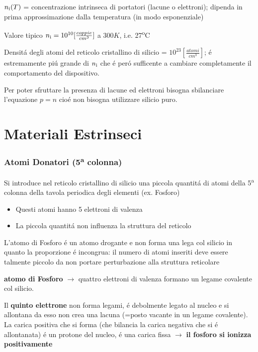 \documentclass{article}
\begin{document}
$n\textsubscript{i}(T)$ = concentrazione intrinseca di portatori (lacune o elettroni); dipenda in prima approssimazione dalla temperatura (in modo esponenziale)

Valore tipico $n\textsubscript{i}=10^{10} [\frac{coppie}{cm^3}]$ a 300$K$, i.e. 27\textsuperscript{o}C

Densit\'a degli atomi del reticolo cristallino di silicio = $10^{23} [\frac{atomi}{cm^3}]$; \'e estremamente pi\'u grande di $n\textsubscript{i}$ che \'e per\'o sufficente a cambiare completamente il comportamento del dispositivo.

Per poter sfruttare la presenza di lacune ed elettroni bisogna sbilanciare l'equazione $p=n$ cio\'e non bisogna utilizzare silicio puro.

\section{Materiali Estrinseci}
\subsubsection{Atomi Donatori (5\textsuperscript{a} colonna)}

Si introduce nel reticolo cristallino di silicio una piccola quantit\'a di atomi della 5\textsuperscript{a} colonna della tavola periodica degli elementi (ex. Fosforo)

\begin{itemize}
    \item Questi atomi hanno 5 elettroni di valenza
    \item La piccola quantit\'a non influenza la struttura del reticolo
\end{itemize}

L'atomo di Fosforo \'e un atomo drogante e non forma una lega col silicio in quanto la proporzione \'e incongrua: il numero di atomi inseriti deve essere talmente piccolo da non portare perturbazione alla struttura reticolare

\textbf{atomo di Fosforo} $\rightarrow$ quattro elettroni di valenza formano un legame covalente col silicio.

Il \textbf{quinto elettrone} non forma legami, \'e debolmente legato al nucleo e si allontana da esso non crea una lacuna (=posto vacante in un legame covalente).
La carica positiva che si forma (che bilancia la carica negativa che si \'e allontanata) \'e un protone del nucleo, \'e una carica fissa $\rightarrow$ \textbf{il fosforo si ionizza positivamente}
\end{document}
